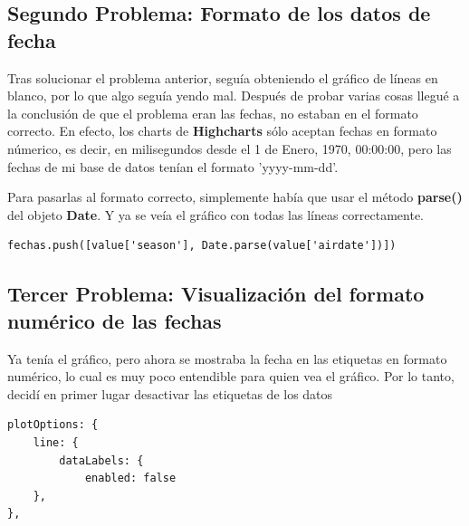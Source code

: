 \documentclass[12pt]{article}
\begin{document}
\subsection{Segundo Problema: Formato de los datos de fecha}
Tras solucionar el problema anterior, seguía obteniendo el gráfico de líneas en blanco, por lo que algo seguía yendo mal. Después de probar varias cosas llegué a la conclusión de que el problema eran las fechas, no estaban en el formato correcto. En efecto, los charts de \textbf{Highcharts} sólo aceptan fechas en formato númerico, es decir, en milisegundos desde el 1 de Enero, 1970, 00:00:00, pero las fechas de mi base de datos tenían el formato 'yyyy-mm-dd'. 

Para pasarlas al formato correcto, simplemente había que usar el método \textbf{parse()} del objeto \textbf{Date}. Y ya se veía el gráfico con todas las líneas correctamente.
\begin{lstlisting}
fechas.push([value['season'], Date.parse(value['airdate'])])
\end{lstlisting}

\subsection{Tercer Problema: Visualización del formato numérico de las fechas}

Ya tenía el gráfico, pero ahora se mostraba la fecha en las etiquetas en formato numérico, lo cual es muy poco entendible para quien vea el gráfico. Por lo tanto, decidí en primer lugar desactivar las etiquetas de los datos
\begin{lstlisting}
plotOptions: {
	line: {
		dataLabels: {
			enabled: false
	},
},
\end{lstlisting}
\end{document}

